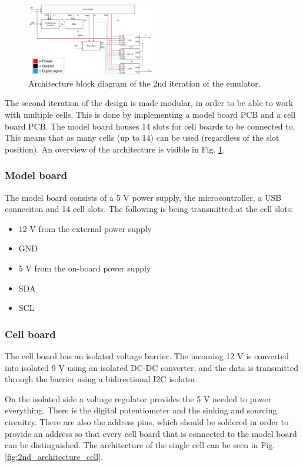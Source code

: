 \begin{figure}[h]
    \centering
    \includegraphics[width=0.5\textwidth]{architecture_2nd_iteration.pdf}
    \caption{Architecture block diagram of the 2nd iteration of the emulator.}
    \label{fig:2nd_architecture}
\end{figure}

The second iteration of the design is made modular, in order to be able to work
 with multiple cells. This is done by implementing a model board
PCB and a cell board PCB. The model board houses 14 slots for cell boards to be 
connected to. This means that as many cells (up to 14) can be used (regardless 
of the slot position). An overview of the architecture is visible in 
Fig. \ref{fig:2nd_architecture}.

    \subsubsection{Model board}
    The model board consists of a 5 V power supply, the microcontroller, a USB 
    conneciton and 14 cell slots. The following is being transmitted at the
    cell slots:

    \begin{itemize}
        \item 12 V from the external power supply
        \item GND
        \item 5 V from the on-board power supply
        \item SDA
        \item SCL
    \end{itemize}

    \subsubsection{Cell board}
    The cell board has an isolated voltage barrier. The incoming 12 V is 
    converted into isolated 9 V using an isolated DC-DC converter, and the data is
    transmitted through the barrier using a bidirectional I2C isolator.

    On the isolated side a voltage regulator provides 
    the 5 V needed to power everything. There is the digital potentiometer
    and the sinking and sourcing circuitry. There are also the address pins, which
    should be soldered in order to provide an address so that every cell board that 
    is connected to the model board can be distinguished.
    The architecture of the single cell can be seen in Fig. 
    \ref{fig:2nd_architecture_cell}.

